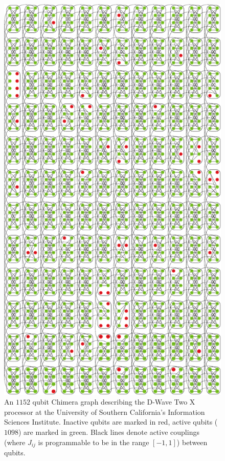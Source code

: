  \begin{figure}[t]
  \centering
   \includegraphics[width=.9\columnwidth]{chapters/Test-driving/chimera.pdf}
   \caption{An $1152$ qubit Chimera graph describing the D-Wave Two X processor at the University of Southern California's Information Sciences Institute. Inactive qubits are marked in red, active qubits ($1098$) are marked in green. Black lines denote active couplings (where $J_{ij}$ is programmable to be in the range $[-1,1]$) between qubits.}
   \label{fig:chimera_test-driving}
 \end{figure}

